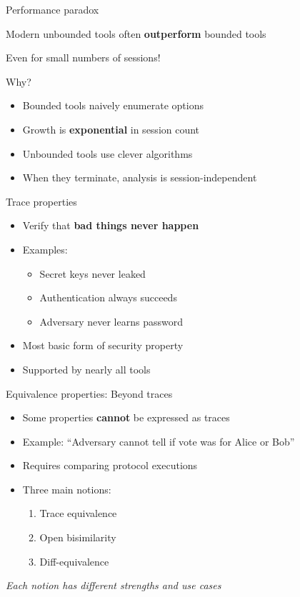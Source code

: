 \documentclass[aspectratio=169, lualatex, handout]{beamer}
\begin{document}
\begin{frame}{Performance paradox}
	\begin{center}
		\Large
		Modern unbounded tools often \textbf{outperform} bounded tools

		\vspace{0.5em}

		\normalsize
		Even for small numbers of sessions!
	\end{center}
	\vspace{1em}
	Why?
	\begin{itemize}
		\item Bounded tools naively enumerate options
		\item Growth is \textbf{exponential} in session count
		\item Unbounded tools use clever algorithms
		\item When they terminate, analysis is session-independent
	\end{itemize}
\end{frame}

\begin{frame}{Trace properties}
	\begin{itemize}
		\item Verify that \textbf{bad things never happen}
		\item Examples:
		      \begin{itemize}
			      \item Secret keys never leaked
			      \item Authentication always succeeds
			      \item Adversary never learns password
		      \end{itemize}
		\item Most basic form of security property
		\item Supported by nearly all tools
	\end{itemize}
\end{frame}

\begin{frame}{Equivalence properties: Beyond traces}
	\begin{itemize}
		\item Some properties \textbf{cannot} be expressed as traces
		\item Example: ``Adversary cannot tell if vote was for Alice or Bob''
		\item Requires comparing protocol executions
		\item Three main notions:
		      \begin{enumerate}
			      \item Trace equivalence
			      \item Open bisimilarity
			      \item Diff-equivalence
		      \end{enumerate}
	\end{itemize}
	\begin{center}
		\textit{Each notion has different strengths and use cases}
	\end{center}
\end{frame}
\end{document}
